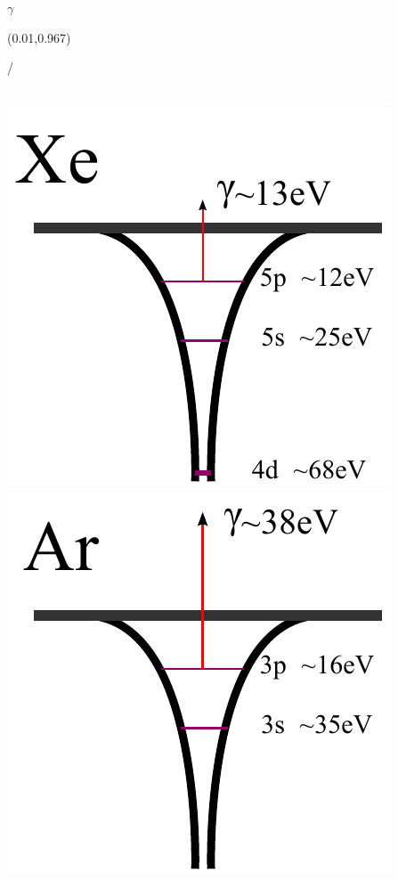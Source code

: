 \documentclass{beamer}
\makeatletter
\newcommand{\framenumber}{
\begin{textblock}{0}(0.01,0.967)
\begin{scriptsize}
{\color{gray}\insertframenumber/\inserttotalframenumber}
\end{scriptsize}
\end{textblock}
}
\makeatother
\begin{document}
\begin{frame}{$\gamma$}\framenumber
\begin{columns}[t]
    \includegraphics[width=\textwidth]{figures/appendix/photo_ionization_Xe_5p}
    \includegraphics[width=\textwidth]{figures/appendix/photo_ionization_Ar_3p}

\end{columns}
\end{frame}
\end{document}
